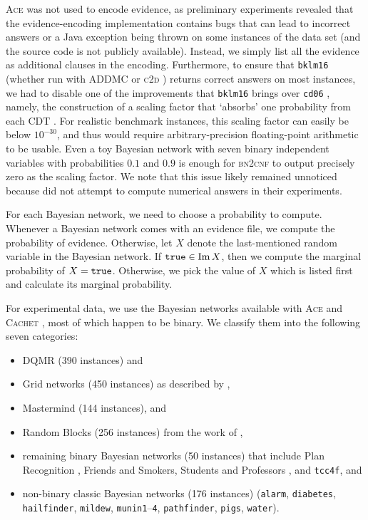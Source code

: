 \textsc{Ace} was not used to encode evidence, as preliminary experiments
revealed that the evidence-encoding implementation contains bugs that can lead
to incorrect answers or a Java exception being thrown on some instances of the
data set (and the source code is not publicly available). Instead, we simply
list all the evidence as additional clauses in the encoding. Furthermore, to
ensure that \texttt{bklm16} \citep{DBLP:conf/ecai/BartKLM16} (whether run with
\textsc{ADDMC} \citep{DBLP:conf/aaai/DudekPV20} or \textsc{c2d}
\citep{DBLP:conf/ecai/Darwiche04}) returns correct answers on most instances, we
had to disable one of the improvements that \texttt{bklm16} brings over
\texttt{cd06} \citep{DBLP:conf/sat/ChaviraD06}, namely, the construction of a
scaling factor that `absorbs' one probability from each CDT
\citep{DBLP:conf/ecai/BartKLM16}. For realistic benchmark instances, this
scaling factor can easily be below $10^{-30}$, and thus would require
arbitrary-precision floating-point arithmetic to be usable. Even a toy Bayesian
network with seven binary independent variables with probabilities $0.1$ and
$0.9$ is enough for \textsc{bn2cnf} to output precisely zero as the scaling
factor. We note that this issue likely remained unnoticed because
\citet{DBLP:conf/ecai/BartKLM16} did not attempt to compute numerical answers in
their experiments.

For each Bayesian network, we need to choose a probability to compute. Whenever
a Bayesian network comes with an evidence file, we compute the probability of
evidence. Otherwise, let $X$ denote the last-mentioned random variable in the
Bayesian network. If $\texttt{true}{} \in \operatorname{Im} X$, then we compute the marginal
probability of $X = \texttt{true}{}$. Otherwise, we pick the value of $X$ which is
listed first and calculate its marginal probability.

For experimental data, we use the Bayesian networks available with \textsc{Ace}
and \textsc{Cachet} \citep{DBLP:conf/sat/SangBBKP04}, most of which happen to be
binary. We classify them into the following seven categories:
\begin{itemize}
  \item DQMR (390 instances) and
  \item Grid networks (450 instances) as described by
        \citet{DBLP:conf/aaai/SangBK05},
  \item Mastermind (144 instances), and
  \item Random Blocks (256 instances) from the work of
        \citet{DBLP:journals/ijar/ChaviraDJ06},
  \item remaining binary Bayesian networks (50 instances) that include Plan
        Recognition \citep{DBLP:conf/aaai/SangBK05}, Friends and Smokers,
        Students and Professors \citep{DBLP:journals/ijar/ChaviraDJ06}, and
        \texttt{tcc4f}, and
  \item non-binary classic Bayesian networks (176 instances) (\texttt{alarm},
        \texttt{diabetes}, \texttt{hailfinder}, \texttt{mildew},
        \texttt{munin1}--\texttt{4}, \texttt{pathfinder}, \texttt{pigs},
        \texttt{water}).
\end{itemize}

